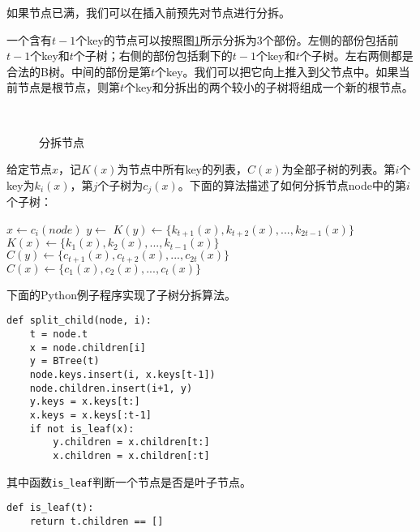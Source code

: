 \documentclass[UTF8]{article}
\begin{document}
如果节点已满，我们可以在插入前预先对节点进行分拆。

一个含有$t-1$个key的节点可以按照图\ref{fig:node-split}所示分拆为3个部份。左侧的部份包括前$t-1$个key和$t$个子树；右侧的部份包括剩下的$t-1$个key和$t$个子树。左右两侧都是合法的B树。中间的部份是第$t$个key。我们可以把它向上推入到父节点中。如果当前节点是根节点，则第$t$个key和分拆出的两个较小的子树将组成一个新的根节点。

\begin{figure}[htbp]
  \centering
   \\
  \caption{分拆节点}
  \label{fig:node-split}
\end{figure}

给定节点$x$，记$K(x)$为节点中所有key的列表，$C(x)$为全部子树的列表。第$i$个key为$k_i(x)$，第$j$个子树为$c_j(x)$。下面的算法描述了如何分拆节点node中的第$i$个子树：

\begin{algorithmic}[1]
  \State $x \gets c_i(node)$
  \State $y \gets$ 
  \State {}
  \State {}
  \State $K(y) \gets \{k_{t+1}(x), k_{t+2}(x), ..., k_{2t-1}(x)\}$
  \State $K(x) \gets \{k_1(x), k_2(x), ..., k_{t-1}(x)\}$
    \State $C(y) \gets \{c_{t+1}(x), c_{t+2}(x), ..., c_{2t}(x)\}$
    \State $C(x) \gets \{c_1(x), c_2(x), ..., c_t(x)\}$
  \EndIf
\EndProcedure
\end{algorithmic}

下面的Python例子程序实现了子树分拆算法。

\lstset{language=Python}
\begin{lstlisting}
def split_child(node, i):
    t = node.t
    x = node.children[i]
    y = BTree(t)
    node.keys.insert(i, x.keys[t-1])
    node.children.insert(i+1, y)
    y.keys = x.keys[t:]
    x.keys = x.keys[:t-1]
    if not is_leaf(x):
        y.children = x.children[t:]
        x.children = x.children[:t]
\end{lstlisting}

其中函数\texttt{is\_leaf}判断一个节点是否是叶子节点。

\lstset{language=Python}
\begin{lstlisting}
def is_leaf(t):
    return t.children == []
\end{lstlisting}

\end{document}
